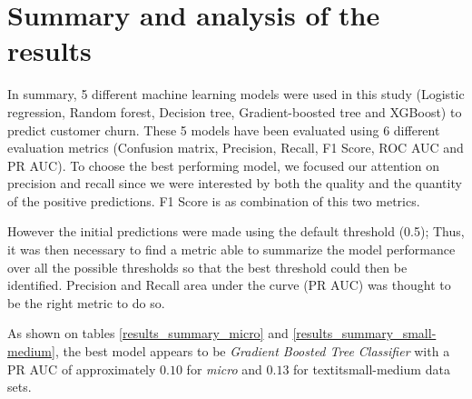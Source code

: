 \documentclass[LaM,binding=0.6cm, english]{sapthesis}
\begin{document}
\section{Summary and analysis of the results}

In summary, 5 different machine learning models were used in this study (Logistic regression, Random forest, Decision tree, Gradient-boosted tree and XGBoost) to predict customer churn. These 5 models have been evaluated using 6 different evaluation metrics (Confusion matrix, Precision, Recall, F1 Score, ROC AUC and PR AUC). To choose the best performing model, we focused our attention on precision and recall since we were interested by both the quality and the quantity of the positive predictions. F1 Score is as combination of this two metrics. 

However the initial predictions were made using the default threshold (0.5); Thus, it was then necessary to find a metric able to summarize the model performance over all the possible thresholds so that the best threshold could then be identified. Precision and Recall area under the curve (PR AUC) was thought to be the right metric to do so.

As shown on tables \ref{results_summary_micro} and \ref{results_summary_small-medium}, the best model appears to be \textit{Gradient Boosted Tree Classifier} with a PR AUC of approximately $0.10$ for \textit{micro} and $0.13$ for textit{small-medium} data sets. 


\begin{table}[!ht]
\centering
{}
\vspace{2mm}
\caption{Results summary (Micro)}
\label{results_summary_micro}
\end{table}
\end{document}
